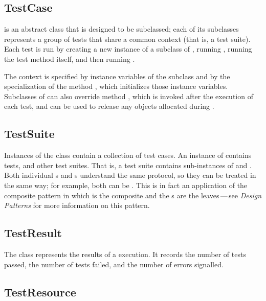 \documentclass[a4paper,10pt,twoside]{book}
\begin{document}
\subsection{TestCase}

 is an abstract class that is designed to be subclassed; each of its subclasses represents a group of tests that share a common context (that is, a test suite).
Each test is run by creating a new instance of a subclass of ,
running , running the test method itself, and then running .

The context is specified
by instance variables of the subclass
and by the specialization of the method
, which initializes those instance variables.
Subclasses of  can also override method
, which is invoked after the execution of each test,
and can be used to release any objects
allocated during .
\subsection{TestSuite}

Instances of the class  contain a collection of test cases.  An
instance of  contains tests, and other test suites.
That is, a test suite contains sub-instances of
 and .
Both individual s and s understand the same protocol, so they can be treated in the same way; for example, both can be .
This is in fact an application of the composite
pattern in which  is the composite and the
s are the leaves\,---\,see \textit{Design Patterns} for more information on this pattern\cite{Gamm95a}.
\subsection{TestResult}

The class  represents the results of a
 execution.  It records the number of tests passed,
the number of tests failed, and the number of errors signalled.

\subsection{TestResource}
\end{document}
